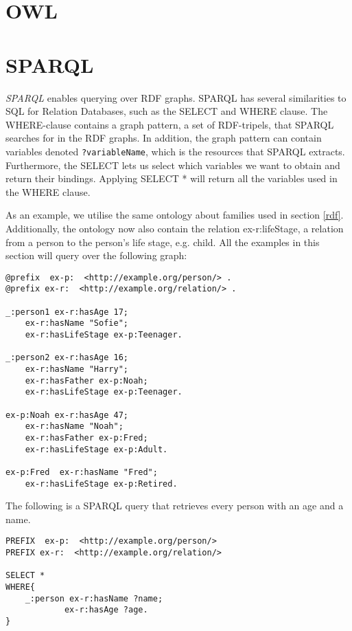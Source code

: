 \section{OWL}

\section{SPARQL}
\emph{SPARQL}\cite{SPARQL} enables querying over RDF graphs. SPARQL has several similarities to SQL for Relation Databases, such as the SELECT and WHERE clause. The WHERE-clause contains a graph pattern, a set of RDF-tripels, that SPARQL searches for in the RDF graphs. In addition, the graph pattern can contain variables denoted \lstinline{?variableName}, which is the resources that SPARQL extracts. Furthermore, the SELECT lets us select which variables we want to obtain and return their bindings. Applying SELECT * will return all the variables used in the WHERE clause.

\para
As an example, we utilise the same ontology about families used in section \ref{rdf}.  Additionally, the ontology now also contain the relation ex-r:lifeStage, a relation from a person to the person's life stage, e.g. child. All the examples in this section will query over the following graph: 

\para
\begin{lstlisting}[frame=single, language=turtle, frame=none]
@prefix  ex-p:  <http://example.org/person/> . 
@prefix ex-r:  <http://example.org/relation/> . 

_:person1 ex-r:hasAge 17;
    ex-r:hasName "Sofie";
    ex-r:hasLifeStage ex-p:Teenager.

_:person2 ex-r:hasAge 16;
    ex-r:hasName "Harry";
    ex-r:hasFather ex-p:Noah;
    ex-r:hasLifeStage ex-p:Teenager.

ex-p:Noah ex-r:hasAge 47;
    ex-r:hasName "Noah";
    ex-r:hasFather ex-p:Fred;
    ex-r:hasLifeStage ex-p:Adult. 

ex-p:Fred  ex-r:hasName "Fred";
    ex-r:hasLifeStage ex-p:Retired. 
\end{lstlisting}

\para
The following is a SPARQL query that retrieves every person with an age and a name. 

\para
\begin{lstlisting}[frame=single, language=turtle, frame=none]
PREFIX  ex-p:  <http://example.org/person/> 
PREFIX ex-r:  <http://example.org/relation/> 

SELECT *
WHERE{
    _:person ex-r:hasName ?name;
            ex-r:hasAge ?age.
}
\end{lstlisting}


